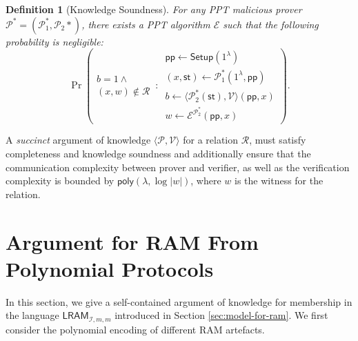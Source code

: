 \documentclass[sigconf]{acmart}
\newtheorem{definition}{Definition}[section]
\newcommand{\pp}{\mathsf{pp}}
\newcommand{\LRAM}[3]{\ensuremath{\mathsf{LRAM}_{\mathcal{#1},#2,#3}}}
\newcommand{\prover}{\ensuremath{\mathcal{P}}}
\newcommand{\verifier}{\ensuremath{\mathcal{V}}}
\newcommand{\R}{\mathcal{R}}
\newcommand{\ext}{\ensuremath{\mathcal{E}}}
\newcommand{\setup}{\mathsf{Setup}}
\newcommand{\secp}{\ensuremath{\lambda}}
\begin{document}
		\begin{definition}[Knowledge Soundness]
			\label{def:aok-ks}
			For any PPT malicious prover $\prover^* = (\prover_1^*,\prover_2*)$, there exists a PPT algorithm $\ext$ such that the following probability is negligible:
			\[
			\Pr \left( 
			\begin{matrix}
				b=1 \wedge \\
				(x,w)\not\in \R
			\end{matrix}
			\,:\,
			\begin{matrix}
				\pp \leftarrow \setup(1^\secp) \\
				(x,\mathsf{st}) \leftarrow \prover_1^*(1^\secp,\pp) \\
				b \leftarrow \langle\prover_2^* (\mathsf{st}) ,\verifier\rangle (\pp,x) \\
				w \leftarrow \ext^{\prover_2^*} (\pp,x)
			\end{matrix}
			\right) .
			\]	
		\end{definition}
		
		A \emph{succinct} argument of knowledge $\langle\prover,\verifier\rangle$ for a relation $\R$, must satisfy completeness and knowledge soundness and additionally ensure that the communication complexity between prover and verifier, as well as the verification complexity is bounded by $\mathsf{poly}(\secp,\log |w|)$, where $w$ is the witness for the relation.
		
		
		
		
		
		
		
		\section{Argument for RAM From Polynomial Protocols}\label{sec:poly-proto-ram-app}
		In this section, we give a self-contained argument of knowledge for membership in the language
		$\LRAM{I}{m}{m}$ introduced in Section \ref{sec:model-for-ram}. We first consider the polynomial encoding
		of different RAM artefacts.
\end{document}
